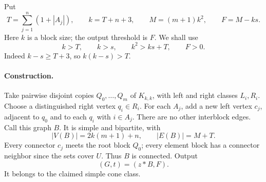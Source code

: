 \documentclass[11pt]{article}
\newcommand{\cone}{\mathbin{*}}
\begin{document}
Put
\[
 T=\sum_{j=1}^n(1+|A_j|),\qquad
 k=T+n+3,\qquad M=(m+1)k^2,\qquad F=M-ks.
 \tag{3}\label{eq:constants}
\]
Here \(k\) is a block size; the output threshold is \(F\).
We shall use
\[
 k>T,\qquad k>s,\qquad k^2>ks+T,\qquad F>0.
 \tag{4}\label{eq:gaps}
\]
Indeed \(k-s\ge T+3\), so \(k(k-s)>T\).

\paragraph{Construction.}
Take pairwise disjoint copies \(Q_0,\ldots,Q_m\) of \(K_{k,k}\), with
left and right classes \(L_i,R_i\). Choose a distinguished right vertex
\(q_i\in R_i\). For each \(A_j\), add a new left vertex \(c_j\), adjacent
to \(q_0\) and to each \(q_i\) with \(i\in A_j\). There are no other
interblock edges. Call this graph \(B\). It is simple and bipartite, with
\[
 |V(B)|=2k(m+1)+n,\qquad |E(B)|=M+T.
\]
Every connector \(c_j\) meets the root block \(Q_0\); every element block
has a connector neighbor since the sets cover \(U\). Thus \(B\) is
connected. Output
\[
       (G,t)=(z\cone B,F).                       \tag{5}
\]
It belongs to the claimed simple cone class.
\end{document}
